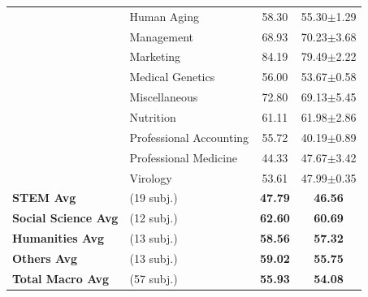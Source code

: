 {\begin{longtable}{@{}l>{\raggedright\arraybackslash}p{3.6cm}cc@{}}
 & Human Aging & 58.30 & 55.30$\pm$1.29 \\
 & Management & 68.93 & 70.23$\pm$3.68 \\
 & Marketing & 84.19 & 79.49$\pm$2.22 \\
 & Medical Genetics & 56.00 & 53.67$\pm$0.58 \\
 & Miscellaneous & 72.80 & 69.13$\pm$5.45 \\
 & Nutrition & 61.11 & 61.98$\pm$2.86 \\
 & Professional Accounting & 55.72 & 40.19$\pm$0.89 \\
 & Professional Medicine & 44.33 & 47.67$\pm$3.42 \\
 & Virology & 53.61 & 47.99$\pm$0.35 \\ \midrule
\textbf{STEM Avg} & (19 subj.) & \textbf{47.79} & \textbf{46.56} \\
\textbf{Social Science Avg} & (12 subj.) & \textbf{62.60} & \textbf{60.69} \\
\textbf{Humanities Avg} & (13 subj.) & \textbf{58.56} & \textbf{57.32} \\
\textbf{Others Avg} & (13 subj.) & \textbf{59.02} & \textbf{55.75} \\ \midrule
\textbf{Total Macro Avg} & (57 subj.) & \textbf{55.93} & \textbf{54.08} \\ \bottomrule
\end{longtable}
}
